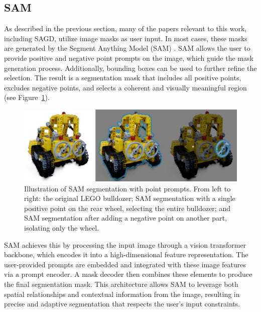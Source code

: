 \documentclass[12pt]{article}
\begin{document}
\subsection{SAM}
As described in the previous section, many of the papers relevant to this work, including SAGD, utilize image masks as user input. In most cases, these masks are generated by the Segment Anything Model (SAM) \cite{SAM}. SAM allows the user to provide positive and negative point prompts on the image, which guide the mask generation process. Additionally, bounding boxes can be used to further refine the selection. The result is a segmentation mask that includes all positive points, excludes negative points, and selects a coherent and visually meaningful region (see Figure~\ref{fig:samdemo}).
\begin{figure}[h!]
	\centering
	\includegraphics[width=\textwidth]{Images/samdemo.png}
	\caption{Illustration of SAM segmentation with point prompts. From left to right: the original LEGO bulldozer; SAM segmentation with a single positive point on the rear wheel, selecting the entire bulldozer; and SAM segmentation after adding a negative point on another part, isolating only the wheel.}
	\label{fig:samdemo}
\end{figure}
\FloatBarrier
\noindent
SAM achieves this by processing the input image through a vision transformer backbone, which encodes it into a high-dimensional feature representation. The user-provided prompts are embedded and integrated with these image features via a prompt encoder. A mask decoder then combines these elements to produce the final segmentation mask. This architecture allows SAM to leverage both spatial relationships and contextual information from the image, resulting in precise and adaptive segmentation that respects the user’s input constraints.
\end{document}
